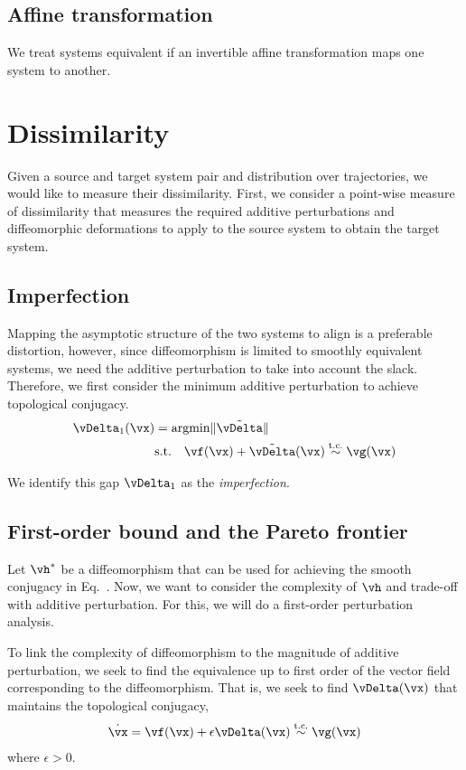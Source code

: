 \documentclass[a4paper,twoside]{article}
\renewcommand{\eqref}{Eq.~\originaleqref}
\newcounter{ct}
\DeclareMathOperator*{\argmin}{\rm argmin}
\DeclarePairedDelimiter{\norm}{\lVert}{\rVert}
\newcommand{\homeo}{\vh}
\begin{document}
\subsection{Affine transformation}
We treat systems equivalent if an invertible affine transformation maps one system to another.

\section{Dissimilarity}
Given a source and target system pair and distribution over trajectories, we would like to measure their dissimilarity.
First, we consider a point-wise measure of dissimilarity that measures the required additive perturbations and diffeomorphic deformations to apply to the source system to obtain the target system.

\subsection{Imperfection}
Mapping the asymptotic structure of the two systems to align is a preferable distortion, however, since diffeomorphism is limited to smoothly equivalent systems, we need the additive perturbation to take into account the slack.
Therefore, we first consider the minimum additive perturbation to achieve topological conjugacy.
\begin{align}
    \vDelta_1(\vx) &= \argmin \norm{\tilde \vDelta}
    \label{eq:d1:min}
    \\
    & \text{s.t.} \quad
    \vf(\vx) + \tilde \vDelta(\vx)
    \overset{\text{t.c.}}{\sim}
    \vg(\vx)
    \label{eq:d1:tc}
\end{align}

We identify this gap $\vDelta_1$ as the \emph{imperfection}.

\subsection{First-order bound and the Pareto frontier}
Let $\homeo^\ast$ be a diffeomorphism that can be used for achieving the smooth conjugacy in \eqref{eq:d1:tc}.
Now, we want to consider the complexity of $\homeo$ and trade-off with additive perturbation.
For this, we will do a first-order perturbation analysis.

To link the complexity of diffeomorphism to the magnitude of additive perturbation, we seek to find the equivalence up to first order of the vector field corresponding to the diffeomorphism.
That is, we seek to find $\vDelta(\vx)$ that maintains the topological conjugacy,
\begin{align}
    \dot\vx = \vf(\vx) + \epsilon \vDelta(\vx)
    \overset{\text{t.c.}}{\sim}
    \vg(\vx)
    \label{eq:pareto:tc}
\end{align}
where $\epsilon > 0$.
\end{document}
